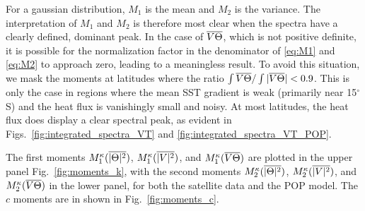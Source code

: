 \documentclass[10pt]{article}
\newcommand{\ol}{\ensuremath{\overline}}
\begin{document}
For a gaussian distribution, $M_1$ is the mean and $M_2$ is the variance. The interpretation of $M_1$ and $M_2$ is therefore most clear when the spectra have a clearly defined, dominant peak. In the case of $\ol{V \Theta}$,  which is not positive definite, it is possible for the normalization factor in the denominator of \eqref{eq:M1} and \eqref{eq:M2} to approach zero, leading to a meaningless result. To avoid this situation, we mask the moments at latitudes where the ratio $\int \ol{V\Theta} / \int | \ol{V \Theta} | < 0.9$. This is only the case in regions where the mean SST gradient is weak (primarily near 15$^\circ$S) and the heat flux is vanishingly small and noisy. At most latitudes, the heat flux does display a clear spectral peak, as evident in Figs.~\ref{fig:integrated_spectra_VT} and \ref{fig:integrated_spectra_VT_POP}.

The first moments $M_1^\kappa( \ol{|\Theta|^2} )$, $M_1^\kappa( \ol{|V|^2} )$, and $M_1^\kappa( \ol{V \Theta} )$ are plotted in the upper panel Fig.~\ref{fig:moments_k}, with the second moments $M_2^\kappa( \ol{|\Theta|^2} )$, $M_2^\kappa( \ol{|V|^2} )$, and $M_2^\kappa( \ol{V \Theta} )$ in the lower panel, for both the satellite data and the POP model. The $c$ moments are in shown in Fig.~\ref{fig:moments_c}.
\end{document}
